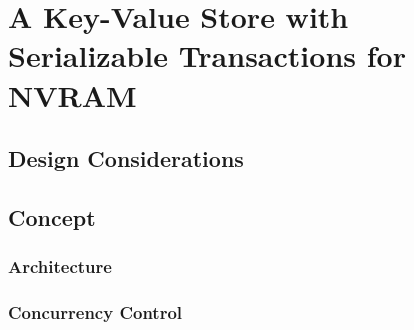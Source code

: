 \chapter{A Key-Value Store with Serializable Transactions for NVRAM}
\label{ch:concept}

\section{Design Considerations}
\section{Concept}
\subsection{Architecture}
\subsection{Concurrency Control}

